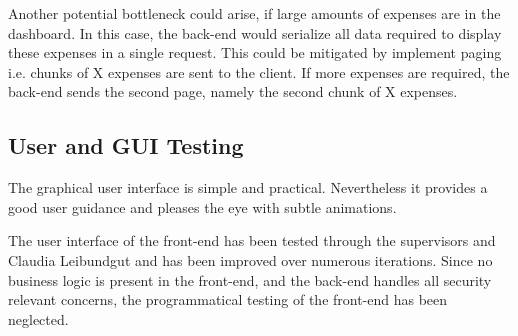 Another potential bottleneck could arise, if large amounts of expenses are in the dashboard. In this case, the back-end would serialize all data required to display these expenses in a single request. This could be mitigated by implement paging i.e. chunks of X expenses are sent to the client. If more expenses are required, the back-end sends the second page, namely the second chunk of X expenses.

\subsection{User and GUI Testing}
The graphical user interface is simple and practical. Nevertheless it provides a good user guidance and pleases the eye with subtle animations.\par

The user interface of the front-end has been tested through the supervisors and Claudia Leibundgut and has been improved over numerous iterations. Since no business logic is present in the front-end, and the back-end handles all security relevant concerns, the programmatical testing of the front-end has been neglected.